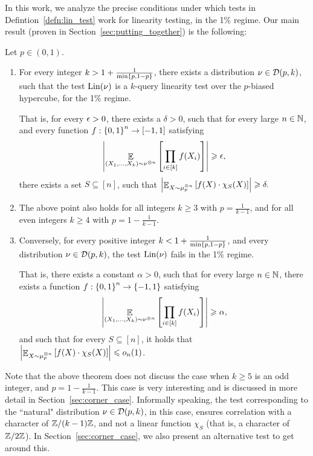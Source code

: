In this work, we analyze the precise conditions under which tests in Defintion~\ref{defn:lin_test} work for linearity testing, in the 1\% regime.
Our main result (proven in Section~\ref{sec:putting_together}) is the following:
\begin{theorem}\label{thm:intro_querybias_main_thm}
	Let $p\in (0,1)$.
	\begin{enumerate}
		\item For every integer $k > 1 + \frac{1}{\min\left\{ p,1-p \right\}}$, there exists a distribution $\nu\in \mathcal D(p,k)$, such that the test $\textnormal{Lin}(\nu)$ is a $k$-query linearity test over the $p$-biased hypercube, for the 1\% regime.
		
		That is, for every $\mathop{\epsilon}>0$, there exists a $\delta>0$, such that for every large $n\in \mathbb{N}$, and every function $f:\left\{ 0,1 \right\}^n\to [-1,1]$ satisfying\[ \left|\mathop{\mathbb{E}}_{(X_1,\dots,X_k)\sim \nu^{\otimes n}} \left[ \prod_{i\in [k]} f(X_i) \right] \right|\geqslant \mathop{\epsilon},\]
		there exists a set $S\subseteq [n]$, such that $ \left|\mathop{\mathbb{E}}_{X\sim \mu_p^{\otimes n}}\left[ f(X)\cdot \chi_S(X) \right]\right| \geqslant \delta.$
		
		\item The above point also holds for all integers $k\geq 3$ with $p=\frac{1}{k-1}$, and for all even integers $k\geq 4$ with $p = 1-\frac{1}{k-1}$.
		
		\item Conversely, for every positive integer $k < 1+\frac{1}{\min\left\{ p,1-p \right\}}$, and every distribution $\nu\in \mathcal D(p,k)$, the test $\textnormal{Lin}(\nu)$ fails in the 1\% regime.
		
		That is, there exists a constant $\alpha>0$, such that for every large $n\in \mathbb{N}$, there exists a function $f:\left\{ 0,1 \right\}^n\to \left\{ -1,1 \right\}$ satisfying \[ \left|\mathop{\mathbb{E}}_{(X_1,\dots,X_k)\sim \nu^{\otimes n}} \left[ \prod_{i\in [k]} f(X_i) \right] \right|\geqslant \alpha,\]
		and such that for every $S\subseteq [n]$, it holds that $ \left|\mathop{\mathbb{E}}_{X\sim \mu_p^{\otimes n}}\left[ f(X)\cdot \chi_S(X) \right]\right| \leqslant o_n(1)$.
	\end{enumerate}
\end{theorem}

\begin{remark}\label{remark:corner_case_intro}
	Note that the above theorem does not discuss the case when $k\geq 5$ is an odd integer, and $p = 1-\frac{1}{k-1}$.
	This case is very interesting and is discussed in more detail in Section~\ref{sec:corner_case}.
	Informally speaking, the test corresponding to the ``natural" distribution $\nu \in \mathcal D(p,k)$, in this case, ensures correlation with a character of $\mathbb{Z}/(k-1)\mathbb{Z}$, and not a linear function $\chi_S$ (that is, a character of $\mathbb{Z}/2\mathbb{Z}$).
	In Section~\ref{sec:corner_case}, we also present an alternative test to get around this.
\end{remark}

